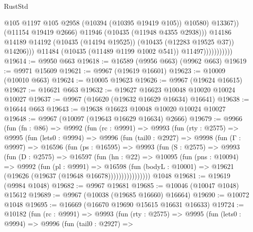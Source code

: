 \begin{lexlean}{RustStd}
\begin{coremodule}
                                        @105
                                        @1197
                                        @105
                                        @2958
                                        (@10394 (@10395 @19419 @105))
                                        @10580)
                                      @13367))
                                  (@11154 @19419 @2666)
                                  @11946
                                  (@10435 (@11948 @4355 @2938)))
                                @14186
                                @14189
                                @14192
                                (@10435 (@14194 @19525))
                                (@10435 (@12283 @19525 @37))
                                @14206)))
                          @11484
                          (@10435 (@11489 @1199 @1002 @541))
                          @11497)))))))))))
@19614 := @9950 @663
@19618 := @16589 (@9956 @663) (@9962 @663)
@19619 := @9971 @15609
@19621 := @9967 (@19619 @16601)
@19623 := @10009 (@10010 @663)
@19624 := @10005 @19623
@19626 := @9967 (@19624 @16615)
@19627 := @16621 @663
@19632 := @19627 @16623 @10048 @10020 @10024 @10027
@19637 := @9967 (@16620 (@19632 @16629 @16634) @16641)
@19638 := @16644 @663
@19643 := @19638 @16623 @10048 @10020 @10024 @10027
@19648 := @9967 (@10097 (@19643 @16629 @16634) @2666)
@19679 := @9966
    (fun (fn : @86) =>
    @9992
      (fun (rc : @9991) =>
      @9993
        (fun (rty : @2575) =>
        @9995
          (fun (lets0 : @9994) =>
          @9996
            (fun (tail0 : @2927) =>
            @9998
              (fun (Γ : @9997) =>
              @16596
                (fun (ps : @16595) =>
                @9993
                  (fun (S : @2575) =>
                  @9993
                    (fun (D : @2575) =>
                    @16597
                      (fun (hn : @22) =>
                      @10095
                        (fun (pns : @10094) =>
                        @9992
                          (fun (pl : @9991) =>
                          @16598
                            (fun (bodyL : @10001) =>
                            @19621 (@19626 (@19637 (@19648 @16678))))))))))))))))
    @1048
@19681 := @19619 (@9984 @1048)
@19682 := @9967 @19681
@19685 := @10046 (@10047 @1048) @15612
@19689 := @9967 (@10038 (@19685 @16660) @16664)
@19690 := @10072 @1048
@19695 := @16669 (@16670 @19690 @15615 @16631 @16633)
@19724 := @10182
    (fun (rc : @9991) =>
    @9993
      (fun (rty : @2575) =>
      @9995
        (fun (lets0 : @9994) =>
        @9996
          (fun (tail0 : @2927) =>

\end{coremodule}
\end{lexlean}
